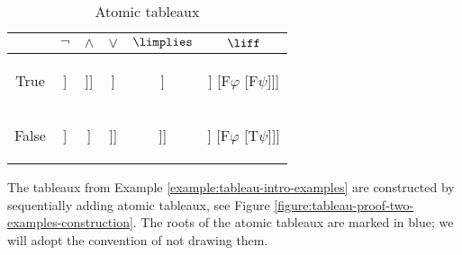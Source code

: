 \begin{table}[htbp]
\centering
\begin{tabular}{@{}c||c|c|c|c|c@{}}
 & $\neg$ & $\land$ & $\lor$ & $\limplies$ & $\liff$  \\ \midrule \midrule
True
&  
\begin{forest}
[$\mathrm{T}\neg\varphi$ [$\mathrm{F}\varphi$]]
\end{forest}
&  
\begin{forest}
[$\mathrm{T}\varphi\land\psi$ [$\mathrm{T}\varphi$ [$\mathrm{T}\psi$]]]
\end{forest}
& 
\begin{forest}
[$\mathrm{T}\varphi\lor\psi$ [$\mathrm{T}\varphi$] [$\mathrm{T}\psi$]]
\end{forest}
&
\begin{forest}
[$\mathrm{T}\varphi\limplies\psi$ [$\mathrm{F}\varphi$] [$\mathrm{T}\psi$]]
\end{forest}
&  
\begin{forest}
[$\mathrm{T}\varphi\liff\psi$ [$\mathrm{T}\varphi$ [$\mathrm{T}\psi$]] [$\mathrm{F}\varphi$ [$\mathrm{F}\psi$]]]
\end{forest}
\\ \midrule
False 
& 
\begin{forest}
[$\mathrm{F}\neg\varphi$ [$\mathrm{T}\varphi$]]
\end{forest}
&
\begin{forest}
[$\mathrm{F}\varphi\land\psi$ [$\mathrm{F}\varphi$] [$\mathrm{F}\psi$]]
\end{forest}
&
\begin{forest}
[$\mathrm{F}\varphi\lor\psi$ [$\mathrm{F}\varphi$ [$\mathrm{F}\psi$]]]
\end{forest}
&
\begin{forest}
[$\mathrm{F}\varphi\limplies\psi$ [$\mathrm{T}\varphi$ [$\mathrm{F}\psi$]]]
\end{forest}
&
\begin{forest}
[$\mathrm{F}\varphi\liff\psi$ [$\mathrm{T}\varphi$ [$\mathrm{F}\psi$]] [$\mathrm{F}\varphi$ [$\mathrm{T}\psi$]]]
\end{forest}
\end{tabular}
\caption{Atomic tableaux}
\label{table:atomic-tableaux}
\end{table}

The tableaux from Example \ref{example:tableau-intro-examples} are constructed by sequentially adding atomic tableaux, see Figure \ref{figure:tableau-proof-two-examples-construction}. The roots of the atomic tableaux are marked in blue; we will adopt the convention of not drawing them.

